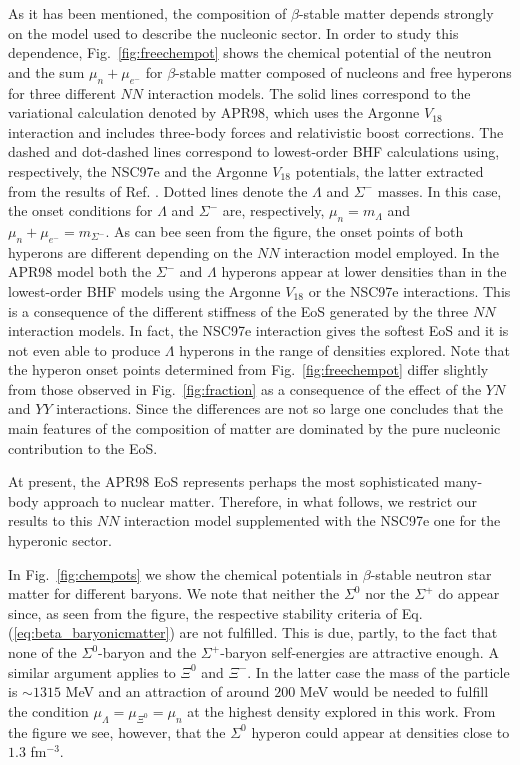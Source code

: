 As it has been mentioned, the composition of $\beta$-stable matter 
depends strongly on the model used to describe the nucleonic sector. 
In order to study this dependence, Fig.\
\ref{fig:freechempot} shows the chemical potential of the neutron and 
the sum
$\mu_{n}+\mu_{e^-}$ for 
$\beta$-stable matter composed of nucleons and 
free hyperons for three different $NN$ interaction models.
The solid lines correspond to the variational calculation denoted
by APR98, which uses the Argonne $V_{18}$ interaction and includes
three-body forces and relativistic boost corrections. The dashed
and dot-dashed lines correspond to lowest-order BHF calculations
using, respectively, the NSC97e and the Argonne $V_{18}$ potentials, the
latter extracted from the results of Ref. \cite{bbs00}.
Dotted lines denote the $\Lambda$ and
$\Sigma^-$ masses. In this case, the onset conditions for $\Lambda$ and
$\Sigma^-$ are, respectively, $\mu_{n}=m_{\Lambda}$ and
$\mu_{n}+\mu_{e^-}=m_{\Sigma^-}$. As can bee seen from the
figure, the onset points of both hyperons are
different depending on the $NN$ interaction model employed. 
In the APR98 model both the $\Sigma^-$ and $\Lambda$ hyperons appear 
at lower densities than in the lowest-order BHF models using the Argonne
$V_{18}$ or the NSC97e interactions. 
This is a consequence of the
different stiffness of the EoS generated by the three $NN$ interaction
models. 
In fact, the NSC97e interaction gives the
softest EoS and it is not even able to produce $\Lambda$ hyperons in
the range of densities explored. 
Note that the hyperon onset points determined from
Fig.~\ref{fig:freechempot}
differ slightly from those observed in Fig.~\ref{fig:fraction} 
as a consequence of the effect of the $YN$ and
$YY$ interactions. Since the differences are not so large one
concludes that
the main features of the composition of matter are dominated by
the pure nucleonic contribution to the EoS.

At present, the APR98 EoS represents perhaps
the most sophisticated many-body approach to nuclear matter. Therefore,
in what follows, we restrict our results to this $NN$ interaction model 
supplemented with the NSC97e one 
for the hyperonic sector. 

In Fig.\ \ref{fig:chempots} we show
the chemical potentials in $\beta$-stable neutron star matter for
different baryons. We note that  
neither the $\Sigma^0$ nor the $\Sigma^+$
do appear since, as seen from the figure, the respective stability criteria
of Eq. (\ref{eq:beta_baryonicmatter}) are not fulfilled.
This is due, partly, to the fact that none of the $\Sigma^0$-baryon 
and the
$\Sigma^+$-baryon self-energies
are attractive enough. A similar argument applies to
$\Xi^0$ and $\Xi^-$. In the latter case the mass of the particle is $\sim
1315$ MeV and an attraction of around $200$ MeV would be needed to fulfill the
condition $\mu_{\Lambda}=\mu_{\Xi^0}=\mu_{n}$ at the
highest density explored in this work. From the figure we see,
however, that the $\Sigma^0$ hyperon could appear at densities 
close to $1.3$
fm$^{-3}$. 

